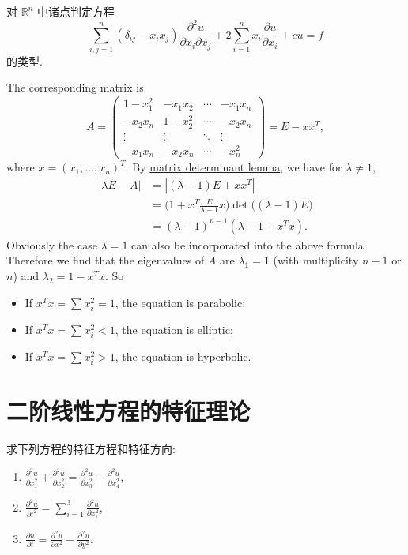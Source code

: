 \begin{exercise}
  对 $\mathbb{R}^n$ 中诸点判定方程
  \[ \sum_{i,j=1}^n (\delta_{ij}-x_ix_j)\frac{\partial^2 u}{\partial x_i\partial x_j}
      + 2\sum_{i=1}^n x_i \frac{\partial u}{\partial x_i} + cu = f \]
  的类型.
\end{exercise}

\begin{solution}
  The corresponding matrix is
  \[ A = \begin{pmatrix}
          1-x_1^2 & -x_1x_2 & \cdots & -x_1x_n \\
          -x_2x_n & 1-x_2^2 & \cdots & -x_2x_n \\
          \vdots  & \vdots  & \ddots & \vdots  \\
          -x_1x_n & -x_2x_n & \cdots & -x_n^2
        \end{pmatrix}
       = E - xx^T,
  \]
  where $x = (x_1,\ldots,x_n)^T$. By \href{https://en.wikipedia.org/wiki/Matrix_determinant_lemma}{matrix determinant lemma}, we have for $\lambda\neq 1$,
  \begin{align*}
    |\lambda E-A|
    & = |(\lambda-1)E + xx^T| \\
    & = \biggl(1 + x^T\frac{E}{\lambda-1}x\biggr) \det \bigl((\lambda-1)E\bigr) \\
    & = (\lambda-1)^{n-1} (\lambda-1+x^Tx).
  \end{align*}
  Obviously the case $\lambda=1$ can also be incorporated into the above formula.
  Therefore we find that the eigenvalues of $A$ are $\lambda_1=1$
  (with multiplicity $n-1$ or $n$)
  and $\lambda_2 = 1-x^Tx$. So
  \begin{itemize}
    \item If $x^Tx = \sum x_i^2 =1$, the equation is parabolic;
    \item If $x^Tx = \sum x_i^2 <1$, the equation is elliptic;
    \item If $x^Tx = \sum x_i^2 >1$, the equation is hyperbolic. \qedhere
  \end{itemize}
\end{solution}


\section{二阶线性方程的特征理论}


\begin{exercise}
  求下列方程的特征方程和特征方向:
  \begin{enumerate}[(1)]
    \item $\frac{\partial^2 u}{\partial x_1^2} + \frac{\partial^2 u}{\partial x_2^2} = \frac{\partial^2 u}{\partial x_3^2} + \frac{\partial^2 u}{\partial x_4^2}$,
    \item $\frac{\partial^2 u}{\partial t^2} = \sum_{i=1}^3 \frac{\partial^2 u}{\partial x_i^2}$,
    \item $\frac{\partial u}{\partial t} = \frac{\partial^2 u}{\partial x^2} - \frac{\partial^2 u}{\partial y^2}$.
  \end{enumerate}
\end{exercise}


